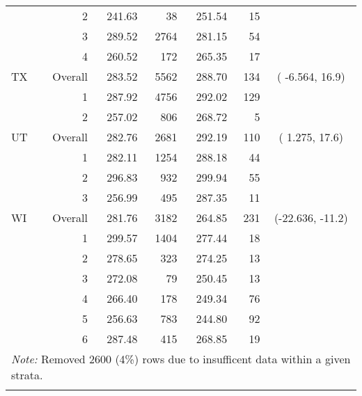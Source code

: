 \begin{longtable}{lrrr@{\extracolsep{.25cm}}rrc}
   & 2 & 241.63 &  38 & 251.54 &  15 &  \\ 
   & 3 & 289.52 & 2764 & 281.15 &  54 &  \\ 
   & 4 & 260.52 & 172 & 265.35 &  17 &  \\ 
   \hline
TX & Overall & 283.52 & 5562 & 288.70 & 134 & ( -6.564,  16.9) \\ 
   & 1 & 287.92 & 4756 & 292.02 & 129 &  \\ 
   & 2 & 257.02 & 806 & 268.72 &   5 &  \\ 
   \hline
UT & Overall & 282.76 & 2681 & 292.19 & 110 & (  1.275,  17.6) \\ 
   & 1 & 282.11 & 1254 & 288.18 &  44 &  \\ 
   & 2 & 296.83 & 932 & 299.94 &  55 &  \\ 
   & 3 & 256.99 & 495 & 287.35 &  11 &  \\ 
   \hline
WI & Overall & 281.76 & 3182 & 264.85 & 231 & (-22.636, -11.2) \\ 
   & 1 & 299.57 & 1404 & 277.44 &  18 &  \\ 
   & 2 & 278.65 & 323 & 274.25 &  13 &  \\ 
   & 3 & 272.08 &  79 & 250.45 &  13 &  \\ 
   & 4 & 266.40 & 178 & 249.34 &  76 &  \\ 
   & 5 & 256.63 & 783 & 244.80 &  92 &  \\ 
   & 6 & 287.48 & 415 & 268.85 &  19 &  \\ 
   \hline \multicolumn{7}{l}{\textit{Note:} Removed 2600 (4\%) rows due to insufficent data within a given strata.} \\\hline
\label{g8math-mlpsa-ctree}
\end{longtable}
